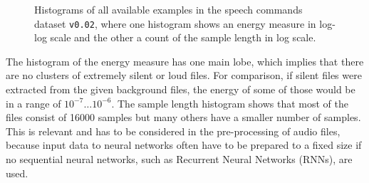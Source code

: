 \begin{figure}[!ht]
  \centering
    \qquad
  \caption{Histograms of all available examples in the speech commands dataset \texttt{v0.02}, where one histogram shows an energy measure in log-log scale and the other a count of the sample length in log scale.}
  \label{fig:exp_dataset_hist}
\end{figure}
\FloatBarrier
\noindent
The histogram of the energy measure has one main lobe, which implies that there are no clusters of extremely silent or loud files.
For comparison, if silent files were extracted from the given background files, the energy of some of those would be in a range of $10^{-7} \dots 10^{-6}$.
The sample length histogram shows that most of the files consist of 16000 samples but many others have a smaller number of samples. 
This is relevant and has to be considered in the pre-processing of audio files, because input data to neural networks often have to be prepared to a fixed size if no sequential neural networks, such as Recurrent Neural Networks (RNNs), are used.



